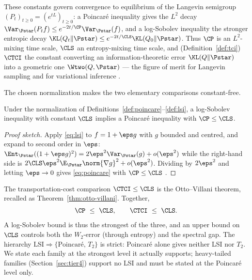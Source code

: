 \documentclass[../main.tex]{subfiles}
\begin{document}
These constants govern convergence to equilibrium of the Langevin semigroup
$(P_t)_{t\ge0}=(e^{tL})_{t\ge0}$: a Poincar\'e inequality gives the $L^2$ decay
$\Var_{\Pstar}(P_tf)\le e^{-2t/\CP}\Var_{\Pstar}(f)$, and a log-Sobolev inequality the
stronger entropic decay $\KL(Q_t\|\Pstar)\le e^{-2t/\CLS}\KL(Q_0\|\Pstar)$. Thus $\CP$ is an
$L^2$-mixing time scale, $\CLS$ an entropy-mixing time scale, and (Definition~\ref{def:tci})
$\CTCI$ the constant converting an information-theoretic error $\KL(Q\|\Pstar)$ into a
geometric one $\Wtwo(Q,\Pstar)$ --- the figure of merit for Langevin sampling and for
variational inference \cite{VempalaWibisono2019,ChewiEtAl2020}.

The chosen normalization makes the two elementary comparisons constant-free.

\begin{theorem}
\label{thm:lsi-implies-poincare}
Under the normalization of Definitions~\ref{def:poincare}--\ref{def:lsi}, a log-Sobolev
inequality with constant $\CLS$ implies a Poincar\'e inequality with $\CP\le\CLS$.
\end{theorem}

\begin{proof}[Proof sketch]
Apply \eqref{eq:lsi} to $f=1+\eps g$ with $g$ bounded and centred, and expand to second
order in $\eps$: $\Ent_{\Pstar}((1+\eps g)^2)=2\eps^2\Var_{\Pstar}(g)+o(\eps^2)$ while the
right-hand side is $2\CLS\eps^2\E_{\Pstar}\norm{\nabla g}^2+o(\eps^2)$. Dividing by
$2\eps^2$ and letting $\eps\to0$ gives \eqref{eq:poincare} with $\CP\le\CLS$
\cite{BakryGentilLedoux2014}.
\end{proof}

The transportation-cost comparison $\CTCI\le\CLS$ is the Otto--Villani theorem, recalled as
Theorem~\ref{thm:otto-villani}. Together,
\[
  \CP\ \le\ \CLS,
  \qquad
  \CTCI\ \le\ \CLS .
\]
A log-Sobolev bound is thus the strongest of the three, and an upper bound on $\CLS$
controls both the $W_2$-error (through entropy) and the spectral gap. The hierarchy
$\mathrm{LSI}\Rightarrow\{\text{Poincar\'e},\,T_2\}$ is strict: Poincar\'e alone gives
neither LSI nor $T_2$. We state each family at the strongest level it actually supports;
heavy-tailed families (Section~\ref{sec:tier4}) support no LSI and must be stated at the
Poincar\'e level only.
\end{document}

